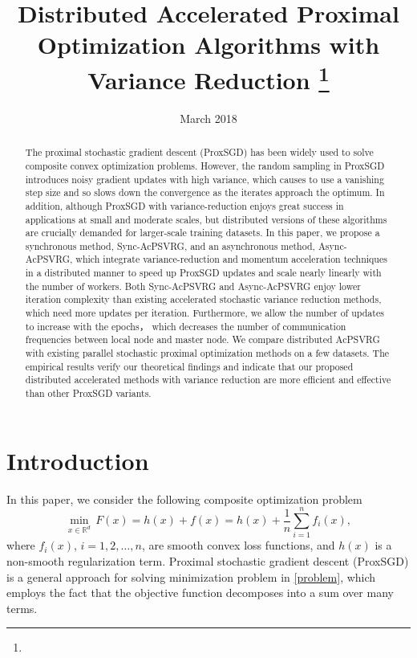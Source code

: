 \documentclass[conference]{IEEEtran}
\date{March 2018}
\newcommand*{\R}{\mathbb{R}}
\theoremstyle{definition}
\theoremstyle{remark}
\begin{document}
\title{Distributed Accelerated Proximal Optimization Algorithms with Variance Reduction
\thanks{}
}
\maketitle

\begin{abstract}
    The proximal stochastic gradient descent (ProxSGD) has been widely used to solve composite convex optimization problems. However, the random sampling in ProxSGD introduces noisy gradient updates with high variance, which causes to use a vanishing step size and so slows down the convergence as the iterates approach the optimum.  In addition, although ProxSGD with variance-reduction enjoys great success in applications at small and moderate scales, but distributed versions of these algorithms are crucially demanded for larger-scale training datasets. In this paper, we propose a synchronous method, Sync-AcPSVRG, and an asynchronous method, Async-AcPSVRG, which integrate variance-reduction and momentum acceleration techniques in a distributed manner to speed up  ProxSGD updates and scale nearly linearly with the number of workers. Both Sync-AcPSVRG and Async-AcPSVRG enjoy lower iteration  complexity than existing  accelerated  stochastic  variance  reduction  methods, which need more updates per iteration. Furthermore, we allow the number of updates to increase with the epochs， which decreases the number of communication frequencies between local node and master node. We compare distributed AcPSVRG with existing parallel stochastic proximal optimization methods on a few datasets. The empirical results verify our theoretical findings and indicate that our proposed distributed accelerated methods with variance reduction are more efficient and effective  than other ProxSGD variants.
\end{abstract}


\section{Introduction}

In this paper, we consider the following composite optimization problem 
\begin{equation}\label{problem}
    \min_{x\in\R^d}\,F(x) = h(x) + f(x)= h(x) + \frac{1}{n} \sum_{i=1}^n f_i(x),
\end{equation}
where $f_i(x)$, $i=1,2,\ldots,n$, are smooth convex loss functions, and $h(x)$ is a non-smooth regularization term. Proximal stochastic gradient descent (ProxSGD) \cite{Nemirovski2009} is a general approach for solving minimization problem in \eqref{problem}, which employs the fact that the objective function decomposes into a sum over many terms. 
\end{document}
